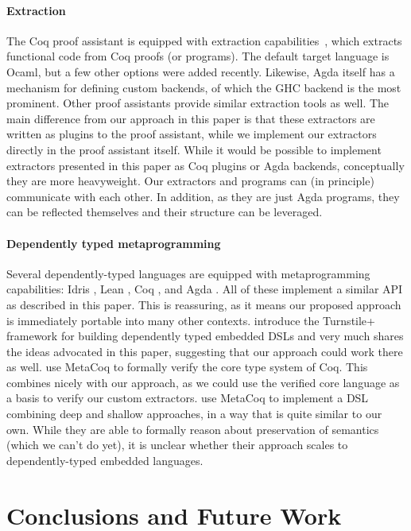 \documentclass[sigplan,anonymous,review]{acmart}
\begin{document}
\paragraph{Extraction}
The Coq proof assistant is equipped with extraction
capabilities~\cite{10.1007/978-3-540-69407-6_39,10.1007/3-540-39185-1_12},
which extracts functional code from Coq proofs (or programs).  The
default target language is Ocaml, but a few other options were added
recently.
%
Likewise, Agda itself has a mechanism for defining custom backends, of
which the GHC backend is the most prominent.
%
Other proof assistants provide similar extraction tools as well.
%
The main difference from our approach in this paper
is that these extractors are written as plugins to the proof
assistant, while we implement our extractors directly in the proof
assistant itself.
%
While it would be possible to implement extractors presented in this
paper as Coq plugins or Agda backends, conceptually they are more
heavyweight.  Our extractors and programs can (in principle)
communicate with each other. In addition, as they are just Agda programs, they can
be reflected themselves and their structure can be leveraged.


\paragraph{Dependently typed metaprogramming}
Several dependently-typed languages are equipped with metaprogramming
capabilities: Idris \cite{idris-refl}, Lean \cite{lean-refl},
Coq \cite{metacoq}, and Agda \cite{agda-refl}.  All of these
implement a similar API as described in this paper.  This is
reassuring, as it means our proposed approach is immediately portable
into many other contexts.
\citet{10.1145/3371071} introduce the Turnstile+ framework for
building dependently typed embedded DSLs and very much
shares the ideas advocated in this paper, suggesting that
our approach could work there as well.
\citet{10.1145/3371076} use MetaCoq to formally verify
the core type system of Coq. This combines nicely with
our approach, as we could use the verified core language
as a basis to verify our custom extractors.
\citet{10.1145/3372885.3373829} use MetaCoq to implement
a DSL combining deep and shallow approaches, in a way that
is quite similar to our own. While they are able to formally
reason about preservation of semantics (which we can't do yet), it is unclear
whether their approach scales to dependently-typed embedded languages.

\section{Conclusions and Future Work} \label{sec:conclusion}
\end{document}
